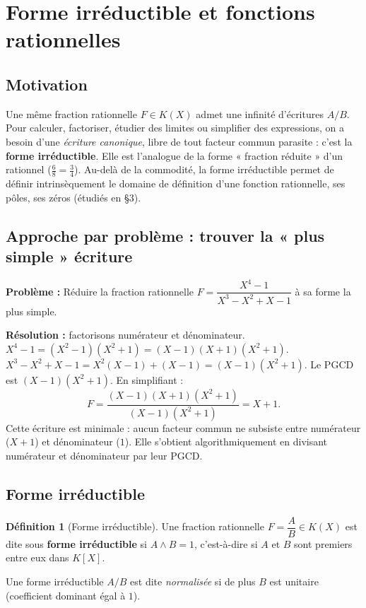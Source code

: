 \documentclass[12pt,a4paper]{report}
\theoremstyle{definition}
\newtheorem{definition}{Définition}[section]
\theoremstyle{remark}
\begin{document}
\section{Forme irréductible et fonctions rationnelles}

\subsection{Motivation}
Une même fraction rationnelle $F \in K(X)$ admet une infinité d'écritures $A/B$. Pour calculer, factoriser, étudier des limites ou simplifier des expressions, on a besoin d'une \emph{écriture canonique}, libre de tout facteur commun parasite : c'est la \textbf{forme irréductible}. Elle est l'analogue de la forme « fraction réduite » d'un rationnel ($\frac{6}{8} = \frac{3}{4}$). Au-delà de la commodité, la forme irréductible permet de définir intrinsèquement le domaine de définition d'une fonction rationnelle, ses pôles, ses zéros (étudiés en §3).

\subsection{Approche par problème : trouver la « plus simple » écriture}
\textbf{Problème :} Réduire la fraction rationnelle $F = \dfrac{X^4 - 1}{X^3 - X^2 + X - 1}$ à sa forme la plus simple.

\textbf{Résolution :} factorisons numérateur et dénominateur.
$X^4 - 1 = (X^2 - 1)(X^2 + 1) = (X - 1)(X + 1)(X^2 + 1)$.
$X^3 - X^2 + X - 1 = X^2(X - 1) + (X - 1) = (X - 1)(X^2 + 1)$.
Le PGCD est $(X - 1)(X^2 + 1)$. En simplifiant :
\[ F = \frac{(X - 1)(X + 1)(X^2 + 1)}{(X - 1)(X^2 + 1)} = X + 1. \]
Cette écriture est minimale : aucun facteur commun ne subsiste entre numérateur ($X + 1$) et dénominateur ($1$). Elle s'obtient algorithmiquement en divisant numérateur et dénominateur par leur PGCD.

\subsection{Forme irréductible}

\begin{definition}[Forme irréductible]
Une fraction rationnelle $F = \dfrac{A}{B} \in K(X)$ est dite sous \textbf{forme irréductible} si $A \wedge B = 1$, c'est-à-dire si $A$ et $B$ sont premiers entre eux dans $K[X]$.

Une forme irréductible $A/B$ est dite \emph{normalisée} si de plus $B$ est unitaire (coefficient dominant égal à $1$).
\end{definition}
\end{document}

